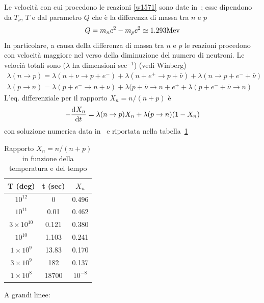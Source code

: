 Le velocità con cui procedono le reazioni \eqref{w1571} sono date
in~\textcite{weinberg:gravitation}; esse dipendono da $T_{\nu}$, $T$ e dal
parametro $Q$ che è la differenza di massa tra $n$ e $p$
\begin{equation}
  Q= m_n c^2 - m_p c^2 \simeq 1.293 {\rm Mev}
\end{equation}
In particolare, a causa della differenza di massa tra $n$ e $p$ le reazioni
procedono con velocità maggiore nel verso della diminuzione del numero di
neutroni.  Le velocià totali sono ($\lambda$ ha dimensioni sec$^{-1}$) (vedi
Winberg)
\begin{subequations}
  \begin{gather}
    \lambda (n \to p) = \lambda (n + \nu \to p + e^-) + \lambda (n + e^+ \to p +
    {\bar \nu}) + \lambda (n \to p + e^- +{\bar \nu }) \\
    \lambda (p \to n) = \lambda (p + e^- \to n + \nu ) + \lambda (p + {\bar \nu}
    \to n + e^+ + \lambda (p + e^- +{\bar \nu} \to n)
  \end{gather}
\end{subequations}
L'eq. differenziale per il rapporto $X_n= n/(n+p)$ è
\begin{equation}
  -\frac{{\mathop{}\!\mathrm{d}^{}}X_n}{\mathop{}\!\mathrm{d} {t}^{}} =  \lambda (n \to p) X_n + \lambda (p \to n) (1-X_n)
\end{equation}
con soluzione numerica data in~\textcite[549]{weinberg:gravitation} e riportata
nella tabella~\ref{X_nvsT}
\begin{table}
  \centering{}
  \caption{Rapporto $X_n=n/(n+p)$ in funzione della temperatura e del tempo}
  \label{X_nvsT}
  \begin{tabular}{ccc}
    \toprule
    T (deg)            & t (sec)    & $X_n$ \\
    \midrule
    $10^{12} $           & 0         & 0.496 \\
    $10^{11}  $          & 0.01      & 0.462 \\
    $3 \times  10^{10}$  & 0.121     & 0.380 \\
    $10^{10}   $         & 1.103     & 0.241 \\
    $1  \times 10^{9}$   &  13.83    & 0.170 \\
    $3  \times 10^{9}$   &  182      & 0.137 \\
    $1  \times 10^{8}$   &  18700    & $10^{-8}$ \\
    \bottomrule
  \end{tabular}
\end{table}
A grandi linee:
